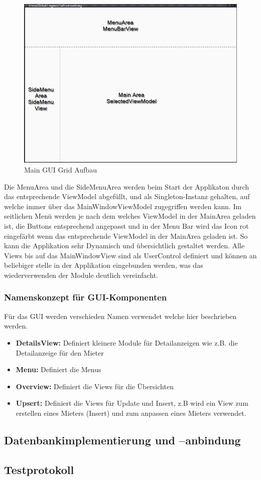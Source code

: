 \begin{figure}[H]
  \begin{center}
    \includegraphics[width=0.6\linewidth]{content/images/MainGuiGrid.png}
    \caption{Main GUI Grid Aufbau}
    \label{guiGrid}
  \end{center}
\end{figure}
Die MenuArea und die SideMenuArea werden beim Start der Applikaton durch das entsprechende ViewModel abgefüllt, und als Singleton-Instanz gehalten, auf welche immer über das MainWindowViewModel zugegriffen werden kann. Im seitlichen Menü werden je nach dem welches ViewModel in der MainArea geladen ist, die Buttons entsprechend angepasst und in der Menu Bar wird das Icon rot eingefärbt wenn das entsprechende ViewModel in der MainArea geladen ist. So kann die Applikation sehr Dynamisch und übersichtlich gestaltet werden.
Alle Views bis auf das MainWindowView sind als UserControl definiert und können an beliebiger stelle in der Applikation eingebunden werden, was das wiederverwenden der Module deutlich vereinfacht.

\subsubsection{Namenskonzept für GUI-Komponenten}
Für das GUI werden verschieden Namen verwendet welche hier beschrieben werden.
\begin{itemize}
  \item \textbf{DetailsView:} Definiert kleinere Module für Detailanzeigen wie z.B. die Detailanzeige für den Mieter
  \item \textbf{Menu:} Definiert die Menus
  \item \textbf{Overview:} Definiert die Views für die Übersichten
  \item \textbf{Upsert:} Definiert die Views für Update und Insert, z.B wird ein View zum erstellen eines Mieters (Insert) und zum anpassen eines Mieters verwendet.
\end{itemize}


\subsection{Datenbankimplementierung und –anbindung}
\subsection{Testprotokoll}
